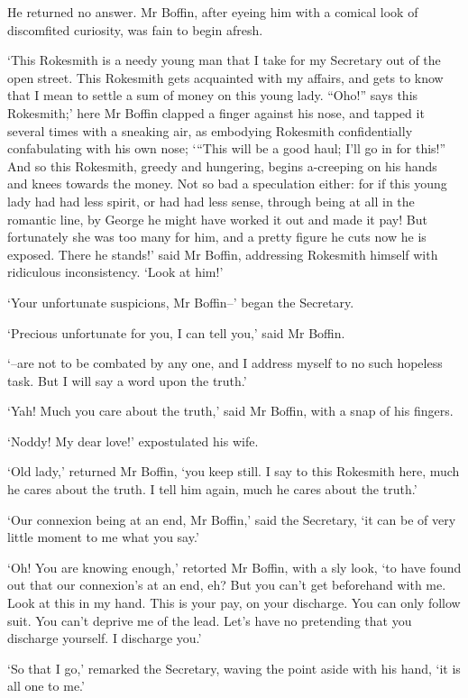 He returned no answer. Mr Boffin, after eyeing him with a comical look
of discomfited curiosity, was fain to begin afresh.

‘This Rokesmith is a needy young man that I take for my Secretary out
of the open street. This Rokesmith gets acquainted with my affairs, and
gets to know that I mean to settle a sum of money on this young lady.
“Oho!” says this Rokesmith;’ here Mr Boffin clapped a finger against
his nose, and tapped it several times with a sneaking air, as embodying
Rokesmith confidentially confabulating with his own nose; ‘“This will
be a good haul; I’ll go in for this!” And so this Rokesmith, greedy and
hungering, begins a-creeping on his hands and knees towards the money.
Not so bad a speculation either: for if this young lady had had less
spirit, or had had less sense, through being at all in the romantic
line, by George he might have worked it out and made it pay! But
fortunately she was too many for him, and a pretty figure he cuts now
he is exposed. There he stands!’ said Mr Boffin, addressing Rokesmith
himself with ridiculous inconsistency. ‘Look at him!’

‘Your unfortunate suspicions, Mr Boffin--’ began the Secretary.

‘Precious unfortunate for you, I can tell you,’ said Mr Boffin.

‘--are not to be combated by any one, and I address myself to no such
hopeless task. But I will say a word upon the truth.’

‘Yah! Much you care about the truth,’ said Mr Boffin, with a snap of his
fingers.

‘Noddy! My dear love!’ expostulated his wife.

‘Old lady,’ returned Mr Boffin, ‘you keep still. I say to this Rokesmith
here, much he cares about the truth. I tell him again, much he cares
about the truth.’

‘Our connexion being at an end, Mr Boffin,’ said the Secretary, ‘it can
be of very little moment to me what you say.’

‘Oh! You are knowing enough,’ retorted Mr Boffin, with a sly look, ‘to
have found out that our connexion’s at an end, eh? But you can’t get
beforehand with me. Look at this in my hand. This is your pay, on your
discharge. You can only follow suit. You can’t deprive me of the lead.
Let’s have no pretending that you discharge yourself. I discharge you.’

‘So that I go,’ remarked the Secretary, waving the point aside with his
hand, ‘it is all one to me.’

